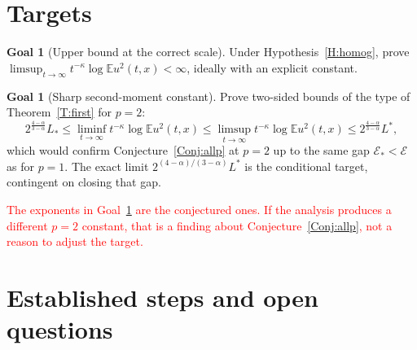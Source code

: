 \documentclass[12pt]{article}
\numberwithin{equation}{section}
\theoremstyle{definition}
\newtheorem{goal}[theorem]{Goal}
\newcommand{\E}{\mathbb{E}}
\newcommand{\cE}{\mathcal{E}}
\newcommand{\myCmts}[1]{\begin{framed}\noindent\textcolor{red}{#1}\end{framed}}
\begin{document}
\section{Targets}\label{S:targets}

\begin{goal}[Upper bound at the correct scale]\label{G:upper}
  Under Hypothesis~\ref{H:homog}, prove
  $\limsup_{t\to\infty}t^{-\kappa}\log\E u^2(t,x)<\infty$, ideally with an
  explicit constant.
\end{goal}


\begin{goal}[Sharp second-moment constant]\label{G:sharp}
  Prove two-sided bounds of the type of Theorem~\ref{T:first} for $p=2$:
  \[
    2^{\frac{4-\alpha}{3-\alpha}}L_*
    \le\liminf_{t\to\infty}t^{-\kappa}\log\E u^2(t,x)
    \le\limsup_{t\to\infty}t^{-\kappa}\log\E u^2(t,x)
    \le2^{\frac{4-\alpha}{3-\alpha}}L^*,
  \]
  which would confirm Conjecture~\ref{Conj:allp} at $p=2$ up to the same gap
  $\cE_*<\cE$ as for $p=1$. The exact limit
  $2^{(4-\alpha)/(3-\alpha)}L^*$ is the conditional target, contingent on
  closing that gap.
\end{goal}

\myCmts{The exponents in Goal~\ref{G:sharp} are the conjectured ones. If
the analysis produces a different $p=2$ constant, that is a finding about
Conjecture~\ref{Conj:allp}, not a reason to adjust the target.}

\section{Established steps and open questions}\label{S:route}
\end{document}
